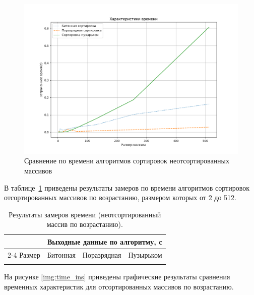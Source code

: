 \begin{figure}[h]
	\begin{center}
		\includegraphics[scale=0.6]{img/time_random.png}
	\end{center}
	\captionsetup{justification=centering}
	\caption{Сравнение по времени алгоритмов сортировок неотсортированных массивов}
	\label{img:time_random}
\end{figure}
\clearpage
В таблице~\ref{tbl:ins} приведены результаты замеров по времени алгоритмов сортировок отсортированных массивов по возрастанию, размером которых от 2 до 512. 
\begin{table}[h]
	\begin{center}
		\begin{threeparttable}
			\captionsetup{justification=raggedright,singlelinecheck=off}
			\caption{Результаты замеров времени (неотсортированный массив по возрастанию).}
			\label{tbl:ins}
			\begin{tabular}{|c|c|c|c|}
				\hline
				& \multicolumn{3}{c|}{\bfseries Выходные данные по алгоритму, с} \\\cline{2-4}
				Размер & Битонная & Поразрядная  & Пузырьком  
				\csvreader{time_ins.csv}{}
				{\\\hline\csvcoli & \csvcolii & \csvcoliii & \csvcoliv} \\
				\hline
			\end{tabular}
		\end{threeparttable}
	\end{center}
\end{table}
\clearpage
На рисунке \ref{img:time_ins} приведены графические результаты сравнения временных характеристик для отсортированных массивов по возрастанию.

